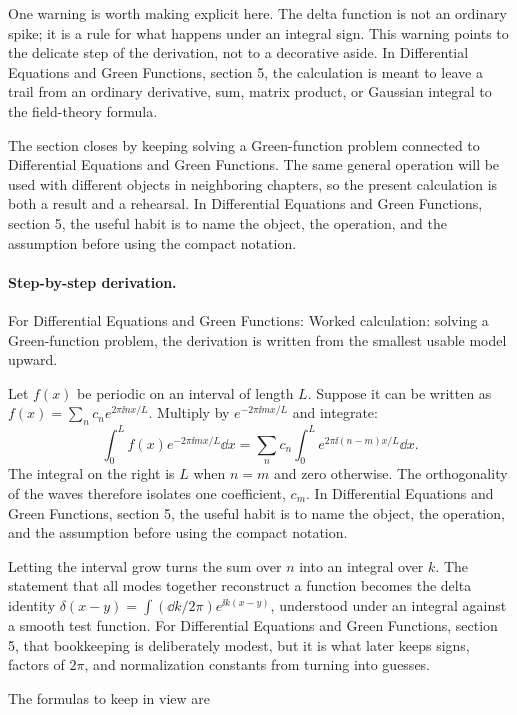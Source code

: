 One warning is worth making explicit here.  The delta function is not an ordinary spike; it is a rule for what happens under an integral sign.  This warning points to the delicate step of the derivation, not to a decorative aside.  In Differential Equations and Green Functions, section 5, the calculation is meant to leave a trail from an ordinary derivative, sum, matrix product, or Gaussian integral to the field-theory formula.

The section closes by keeping solving a Green-function problem connected to Differential Equations and Green Functions.  The same general operation will be used with different objects in neighboring chapters, so the present calculation is both a result and a rehearsal.  In Differential Equations and Green Functions, section 5, the useful habit is to name the object, the operation, and the assumption before using the compact notation.



\paragraph{Step-by-step derivation.}

For Differential Equations and Green Functions: Worked calculation: solving a Green-function problem, the derivation is written from the smallest usable model upward.

Let \(f(x)\) be periodic on an interval of length \(L\).  Suppose it can be written as \(f(x)=\sum_n c_ne^{2\pi\ii nx/L}\).  Multiply by \(e^{-2\pi\ii mx/L}\) and integrate:
\[
  \int_0^L f(x)e^{-2\pi\ii mx/L}\dd x
  =
  \sum_n c_n\int_0^L e^{2\pi\ii(n-m)x/L}\dd x.
\]
The integral on the right is \(L\) when \(n=m\) and zero otherwise.  The orthogonality of the waves therefore isolates one coefficient, \(c_m\).  In Differential Equations and Green Functions, section 5, the useful habit is to name the object, the operation, and the assumption before using the compact notation.

Letting the interval grow turns the sum over \(n\) into an integral over \(k\).  The statement that all modes together reconstruct a function becomes the delta identity \(\delta(x-y)=\int(\dd k/2\pi)e^{\ii k(x-y)}\), understood under an integral against a smooth test function.  For Differential Equations and Green Functions, section 5, that bookkeeping is deliberately modest, but it is what later keeps signs, factors of \(2\pi\), and normalization constants from turning into guesses.

The formulas to keep in view are

